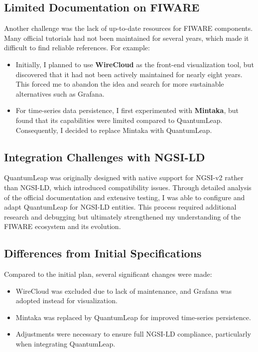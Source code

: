 \subsection*{Limited Documentation on FIWARE}
Another challenge was the lack of up-to-date resources for FIWARE components. Many official tutorials had not been maintained for several years, which made it difficult to find reliable references.  
For example:
\begin{itemize}
    \item Initially, I planned to use \textbf{WireCloud} as the front-end visualization tool, but discovered that it had not been actively maintained for nearly eight years. This forced me to abandon the idea and search for more sustainable alternatives such as Grafana.
    \item For time-series data persistence, I first experimented with \textbf{Mintaka}, but found that its capabilities were limited compared to QuantumLeap. Consequently, I decided to replace Mintaka with QuantumLeap.
\end{itemize}

\subsection*{Integration Challenges with NGSI-LD}
QuantumLeap was originally designed with native support for NGSI-v2 rather than NGSI-LD, which introduced compatibility issues. Through detailed analysis of the official documentation and extensive testing, I was able to configure and adapt QuantumLeap for NGSI-LD entities.  
This process required additional research and debugging but ultimately strengthened my understanding of the FIWARE ecosystem and its evolution.

\subsection*{Differences from Initial Specifications}
Compared to the initial plan, several significant changes were made:
\begin{itemize}
    \item WireCloud was excluded due to lack of maintenance, and Grafana was adopted instead for visualization.
    \item Mintaka was replaced by QuantumLeap for improved time-series persistence.
    \item Adjustments were necessary to ensure full NGSI-LD compliance, particularly when integrating QuantumLeap.
\end{itemize}

